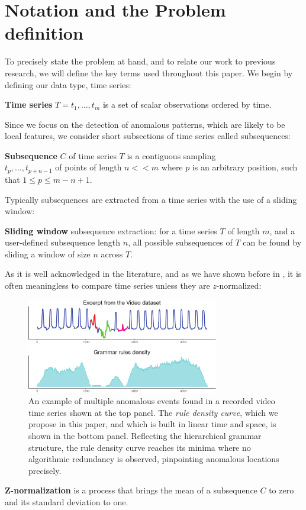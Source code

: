 \documentclass{sig-alternate}
\begin{document}
\section{Notation and the Problem\\ definition}\label{problem}
To precisely state the problem at hand, and to relate our work to previous research, we will define the key terms used throughout this paper. We begin by defining our data type, time series:

\textbf{Time series} $T = t_{1},\dots,t_{m}$ is a set of scalar observations ordered by time.

Since we focus on the detection of anomalous patterns, which are likely to be local features, we consider short subsections of time series called subsequences:

\textbf{Subsequence} $C$ of time series $T$ is a contiguous sampling \\$t_{p},\dots,t_{p+n-1}$ of points of length $n << m$ where $p$ is an arbitrary position, such that $ 1 \leq p \leq m - n + 1$.

Typically subsequences are extracted from a time series with the use of a sliding window:

\textbf{Sliding window} subsequence extraction: for a time series $T$ of length $m$, and a user-defined subsequence  length $n$, all possible subsequences of $T$ can be found by sliding a window of size $n$ across $T$.

As it is well acknowledged in the literature, and as we have shown before in \cite{sax}, it is often meaningless to compare time series unless they are $z$-normalized:

\begin{figure}[t]
  \centering
  \includegraphics[width=84mm]{ECG13.pdf}
  \caption{An example of multiple anomalous events found in a recorded video time series \cite{param_free} shown at the top panel. The \textit{rule density curve}, which we propose in this paper, and which is built in linear time and space, is shown in the bottom panel. Reflecting the hierarchical grammar structure, the rule density curve reaches its minima where no algorithmic redundancy is observed, pinpointing anomalous locations precisely.}
  \label{fig:video1}
\end{figure}
\textbf{Z-normalization} is a process that brings the mean of a subsequence $C$ to zero and its standard deviation to one.
\end{document}
